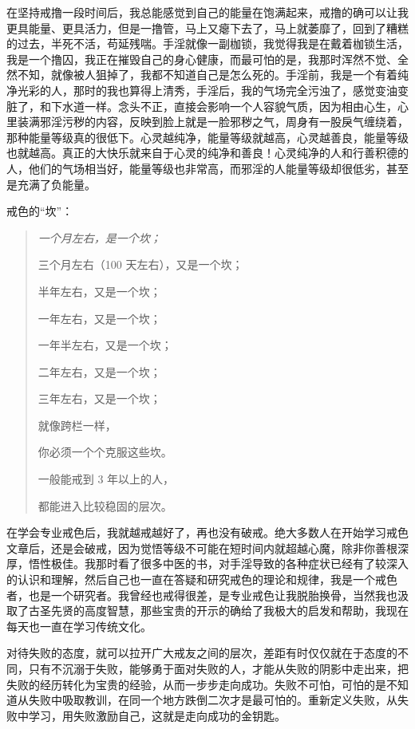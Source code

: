 在坚持戒撸一段时间后，我总能感觉到自己的能量在饱满起来，戒撸的确可以让我更具能量、更具活力，但是一撸管，马上又瘪下去了，马上就萎靡了，回到了糟糕的过去，半死不活，苟延残喘。手淫就像一副枷锁，我觉得我是在戴着枷锁生活，我是一个撸囚，我正在摧毁自己的身心健康，而最可怕的是，我那时浑然不觉、全然不知，就像被人狙掉了，我都不知道自己是怎么死的。手淫前，我是一个有着纯净光彩的人，那时的我也算得上清秀，手淫后，我的气场完全污浊了，感觉变油变脏了，和下水道一样。念头不正，直接会影响一个人容貌气质，因为相由心生，心里装满邪淫污秽的内容，反映到脸上就是一脸邪秽之气，周身有一股戾气缠绕着，那种能量等级真的很低下。心灵越纯净，能量等级就越高，心灵越善良，能量等级也就越高。真正的大快乐就来自于心灵的纯净和善良！心灵纯净的人和行善积德的人，他们的气场相当好，能量等级也非常高，而邪淫的人能量等级却很低劣，甚至是充满了负能量。

戒色的“坎”：

\begin{multicols}{2}
    \begin{quotation}\it
        一个月左右，是一个坎；

        三个月左右（100 天左右），又是一个坎；

        半年左右，又是一个坎；

        一年左右，又是一个坎；

        一年半左右，又是一个坎；

        二年左右，又是一个坎；

        三年左右，又是一个坎；

        就像跨栏一样，

        你必须一个个克服这些坎。

        一般能戒到 3 年以上的人，

        都能进入比较稳固的层次。
    \end{quotation}
\end{multicols}

在学会专业戒色后，我就越戒越好了，再也没有破戒。绝大多数人在开始学习戒色文章后，还是会破戒，因为觉悟等级不可能在短时间内就超越心魔，除非你善根深厚，悟性极佳。我那时看了很多中医的书，对手淫导致的各种症状已经有了较深入的认识和理解，然后自己也一直在答疑和研究戒色的理论和规律，我是一个戒色者，也是一个研究者。我曾经也戒得很差，是专业戒色让我脱胎换骨，当然我也汲取了古圣先贤的高度智慧，那些宝贵的开示的确给了我极大的启发和帮助，我现在每天也一直在学习传统文化。

对待失败的态度，就可以拉开广大戒友之间的层次，差距有时仅仅就在于态度的不同，只有不沉溺于失败，能够勇于面对失败的人，才能从失败的阴影中走出来，把失败的经历转化为宝贵的经验，从而一步步走向成功。失败不可怕，可怕的是不知道从失败中吸取教训，在同一个地方跌倒二次才是最可怕的。重新定义失败，从失败中学习，用失败激励自己，这就是走向成功的金钥匙。

